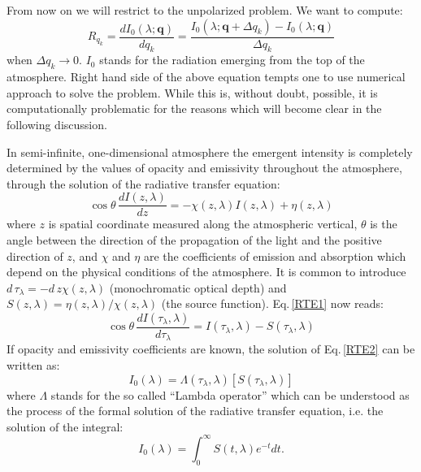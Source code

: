 \documentclass[referee]{aa}
\begin{document}
From now on we will restrict to the unpolarized problem. We want to compute:
\begin{equation}
R_{q_k}= \frac{d I_0(\lambda; \textbf{q})}{d q_k} = \frac{I_0(\lambda; \textbf{q} + \Delta q_k) - I_0(\lambda; \textbf{q})}{\Delta q_k}
\end{equation}
when $\Delta q_k \rightarrow 0$. $I_0$ stands for the radiation emerging from the top of the atmosphere. Right hand side of the above equation tempts one to use numerical approach to solve the problem. While this is, without doubt, possible, it is computationally problematic for the reasons which will become clear in the following discussion.

In semi-infinite, one-dimensional atmosphere the emergent intensity is completely determined by the values of opacity and emissivity throughout the atmosphere, through the solution of the radiative transfer equation:
\begin{equation}
 \cos\theta\,\frac{d I(z, \lambda)}{d z} = -\chi(z,\lambda) I(z,\lambda) + \eta(z, \lambda)
 \label{RTE1}
\end{equation}
where $z$ is spatial coordinate measured along the atmospheric vertical, $\theta$ is the angle between the direction of the propagation of the light and the positive direction of $z$, and $\chi$ and $\eta$ are the coefficients of emission and absorption which depend on the physical conditions of the atmosphere\citep[for the detailed description of physical processes governing radiative transfer see classic work of ][]{Mihalasbook}. It is common to introduce $d\,\tau_{\lambda} = -d\,z \chi(z,\lambda)$ (monochromatic optical depth) and $S(z,\lambda) = \eta(z,\lambda) / \chi(z, \lambda)$ (the source function). Eq.\,\ref{RTE1} now reads:
\begin{equation}
 \cos\theta\,\frac{d I(\tau_{\lambda}, \lambda)}{d\tau_{\lambda}} = I(\tau_{\lambda},\lambda) - S(\tau_{\lambda},\lambda)
 \label{RTE2}
\end{equation}
If opacity and emissivity coefficients are known, the solution of Eq.\,\ref{RTE2} can be written as:
\begin{equation}
 I_0(\lambda) = \Lambda(\tau_{\lambda},\lambda)[S(\tau_{\lambda}, \lambda)]
\end{equation}
where $\Lambda$ stands for the so called ``Lambda operator'' which can be understood as the process of the formal solution of the radiative transfer equation, i.e. the solution of the integral:
\begin{equation}
 I_0(\lambda) = \int_0^{\infty} S(t,\lambda) e^{-t} dt.
\end{equation}
\end{document}
